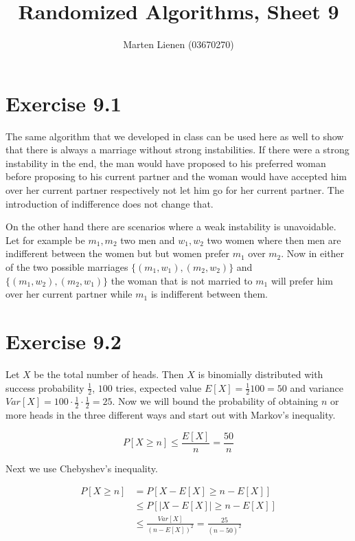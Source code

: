 \documentclass[10pt,a4paper]{article}
\title{Randomized Algorithms, Sheet 9}
\author{Marten Lienen (03670270)}
\begin{document}
\maketitle

\section*{Exercise 9.1}

The same algorithm that we developed in class can be used here as well to show that there is always a marriage without strong instabilities.
If there were a strong instability in the end, the man would have proposed to his preferred woman before proposing to his current partner and the woman would have accepted him over her current partner respectively not let him go for her current partner.
The introduction of indifference does not change that.

On the other hand there are scenarios where a weak instability is unavoidable.
Let for example be $m_{1}, m_{2}$ two men and $w_{1}, w_{2}$ two women where then men are indifferent between the women but but women prefer $m_{1}$ over $m_{2}$.
Now in either of the two possible marriages $\{ (m_{1}, w_{1}), (m_{2}, w_{2}) \}$ and $\{ (m_{1}, w_{2}), (m_{2}, w_{1}) \}$ the woman that is not married to $m_{1}$ will prefer him over her current partner while $m_{1}$ is indifferent between them.

\section*{Exercise 9.2}

Let $X$ be the total number of heads.
Then $X$ is binomially distributed with success probability $\frac{1}{2}$, $100$ tries, expected value $E[X] = \frac{1}{2}100 = 50$ and variance $Var[X] = 100 \cdot \frac{1}{2} \cdot \frac{1}{2} = 25$.
Now we will bound the probability of obtaining $n$ or more heads in the three different ways and start out with Markov's inequality.

\begin{equation*}
  P[X \ge n] \le \frac{E[X]}{n} = \frac{50}{n}
\end{equation*}

Next we use Chebyshev's inequality.

\begin{align*}
  P[X \ge n] & = P[X - E[X] \ge n - E[X]]\\
             & \le P[|X - E[X]| \ge n - E[X]]\\
             & \le \frac{Var[X]}{(n - E[X])^{2}} = \frac{25}{(n - 50)^{2}}
\end{align*}
\end{document}
